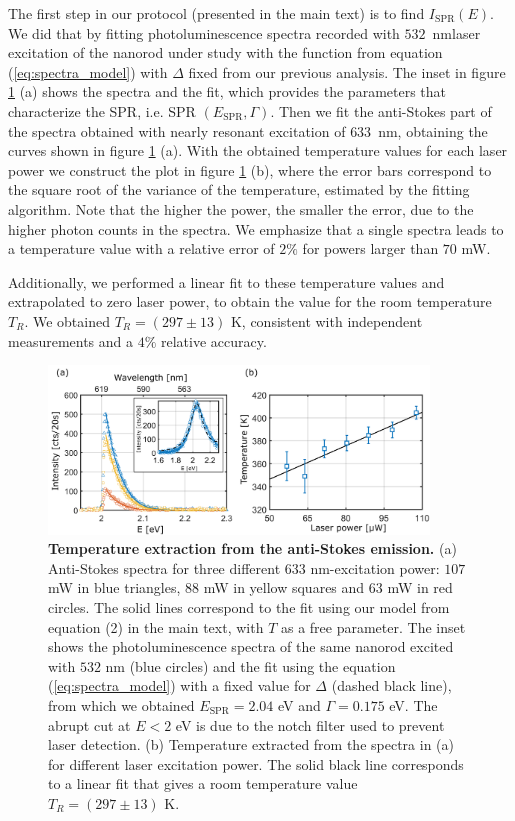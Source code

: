 \documentclass[journal=nalefd,manuscript=letter]{achemso}
\newcommand{\nm}{\ensuremath{\,\textrm{nm}}}
\begin{document}
The first step in our protocol (presented in the main text) is to find $I_{\textrm{SPR}}(E)$. 
We did that by fitting photoluminescence spectra recorded with $532$ \nm laser excitation 
of the nanorod under study with the function from equation (\ref{eq:spectra_model}) with $\Delta$ fixed 
from our previous analysis. The inset in figure \ref{fig:as_fit} (a) shows the spectra and 
the fit, which provides the parameters that characterize the SPR, i.e. SPR 
$(E_\textrm{SPR},\Gamma)$. Then we fit the anti-Stokes part of the spectra obtained with 
nearly resonant excitation of $633$ \nm, obtaining the curves shown in figure \ref{fig:as_fit} (a). 
With the obtained temperature values for each laser power we construct the plot in figure 
\ref{fig:as_fit} (b), where the error bars correspond to the square root of the variance of 
the temperature, estimated by the fitting algorithm.
Note that the higher the power, the smaller the error, due to the higher photon counts in 
the spectra. We emphasize that a single spectra leads to a temperature value with a 
relative error of $2\%$ for powers larger than $70$ mW.

Additionally, we performed a linear fit to these temperature values and extrapolated to 
zero laser power, to obtain the value for the room temperature $T_R$. 
We obtained $T_R = (297 \pm 13)$ K, consistent with independent measurements and a $4\%$ relative accuracy.


\begin{figure}[htp] \centering
\includegraphics[width=0.90\textwidth]{Figures/Supplementary/09_Error_vs_Wavelength/Temp_error.png}
\caption{\textbf{Temperature extraction from the anti-Stokes emission.} 
(a) Anti-Stokes spectra for three different $633$ nm-excitation power: $107$ mW in 
blue triangles, $88$ mW in yellow squares and $63$ mW in red circles. 
The solid lines correspond to the fit using our model from equation (2) in the main text, 
with $T$ as a free parameter. The inset shows the photoluminescence spectra of the same 
nanorod excited with $532$ nm (blue circles) and the fit using the equation 
(\ref{eq:spectra_model}) with a fixed value for $\Delta$ (dashed black line), from which 
we obtained $E_\textrm{SPR}=2.04$ eV and $\Gamma=0.175$ eV. The abrupt cut at $E<2$ eV is due to the
notch filter used to prevent laser detection.  
(b) Temperature extracted from the spectra in (a) for different laser excitation power. 
The solid black line corresponds to a linear fit that gives a room temperature value $T_R = (297 \pm 13)$ K.}
\label{fig:as_fit}
\end{figure}
\end{document}
